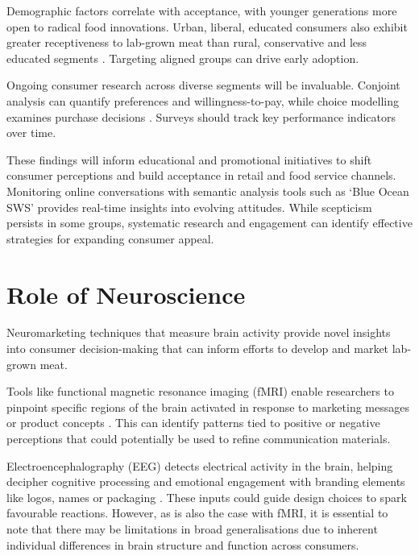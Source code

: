 \documentclass[10pt]{article}
\begin{document}
\begin{sloppypar}
  Demographic factors correlate with acceptance, with younger generations more open to radical food innovations. Urban, liberal, educated consumers also exhibit greater receptiveness to lab-grown meat than rural, conservative and less educated segments \citep{circus_exploring_2018}. Targeting aligned groups can drive early adoption.

  Ongoing consumer research across diverse segments will be invaluable. Conjoint analysis can quantify preferences and willingness-to-pay, while choice modelling examines purchase decisions \citep{wilks_attitudes_2017}. Surveys should track key performance indicators over time.

  These findings will inform educational and promotional initiatives to shift consumer perceptions and build acceptance in retail and food service channels. Monitoring online conversations with semantic analysis tools such as ‘Blue Ocean SWS’ provides real-time insights into evolving attitudes. While scepticism persists in some groups, systematic research and engagement can identify effective strategies for expanding consumer appeal.

  \section{Role of Neuroscience}
  \label{sec:role-of-neuroscience}

  Neuromarketing techniques that measure brain activity provide novel insights into consumer decision-making that can inform efforts to develop and market lab-grown meat.

  Tools like functional magnetic resonance imaging (fMRI) enable researchers to pinpoint specific regions of the brain activated in response to marketing messages or product concepts \citep{bryant_consumer_2018}. This can identify patterns tied to positive or negative perceptions that could potentially be used to refine communication materials.

  Electroencephalography (EEG) detects electrical activity in the brain, helping decipher cognitive processing and emotional engagement with branding elements like logos, names or packaging \citep{khushaba_consumer_2013}. These inputs could guide design choices to spark favourable reactions. However, as is also the case with fMRI, it is essential to note that there may be limitations in broad generalisations due to inherent individual differences in brain structure and function across consumers.


\end{sloppypar}
\end{document}
